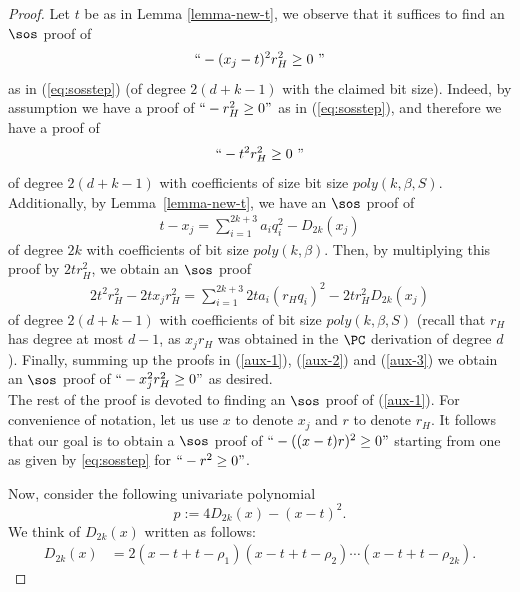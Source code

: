 \documentclass[11pt]{article}
\begin{document}
\begin{proof}
Let $t$ be as in Lemma \ref{lemma-new-t}, we observe that it suffices to find an $\sos$ proof of 
\begin{align}\label{aux-1}
``-(x_j-t)^2r_H^2 \geq 0 \ "
\end{align}
as in (\ref{eq:sosstep}) (of degree $2(d+k-1)$ with the claimed bit size). Indeed, by assumption we have a proof of $``-r_H^2\geq 0"$ as in (\ref{eq:sosstep}), and therefore we have a proof of 
\begin{align}\label{aux-2}
``-t^2r_H^2\geq 0 \ "
\end{align}
of degree $2(d+k-1)$ with coefficients of size bit size $poly(k,\beta,S)$. Additionally, by Lemma~\ref{lemma-new-t}, we have an $\sos$ proof of 
\begin{align}
    t - x_j = \sum_{i=1}^{2k+3}a_iq_i^2 - D_{2k}(x_j) 
\end{align}
of degree $2k$ with coefficients of bit size $poly(k,\beta)$. Then, by multiplying this proof by $2t r_H^2$, we obtain an $\sos$ proof 
\begin{align} \label{aux-3} 
   2t^2r_H^2- 2t x_j r_H^2  = \sum_{i=1}^{2k+3}2ta_i(r_Hq_i)^2  - 2tr_H^2D_{2k}(x_j)  
\end{align}
of degree $2(d+k-1)$ with coefficients of bit size $poly(k,\beta, S)$ (recall that $r_H$ has degree at most $d-1$, as $x_jr_H$ was obtained in the $\PC$ derivation of degree $d$). Finally, summing up the proofs in (\ref{aux-1}), (\ref{aux-2}) and (\ref{aux-3}) we obtain an $\sos$ proof of $``-x_j^2r_H^2\geq0"$ as desired.
\\

The rest of the proof is devoted to finding an $\sos$ proof of (\ref{aux-1}). For convenience of notation, let us  use $x$ to denote $x_j$ and $r$ to denote $r_{H}$.    
It follows that our goal is to obtain a $\sos$ proof of $``-((x-t)r)^2\geq 0"$ starting from one as given by \eqref{eq:sosstep} for $``-r^2\geq 0"$. 

Now, consider the following univariate polynomial 
$$p:= 4D_{2k}(x) - (x-t)^2.$$
%
We think of $D_{2k}(x)$ written as follows:
\begin{align}
D_{2k}(x)&=2(x-t+t-\rho_{1})(x-t+t-\rho_{2})\cdots (x-t+t-\rho_{2k}).     \label{eq:domain_f_rootsM}
%
\end{align}
%


\end{proof}
\end{document}

